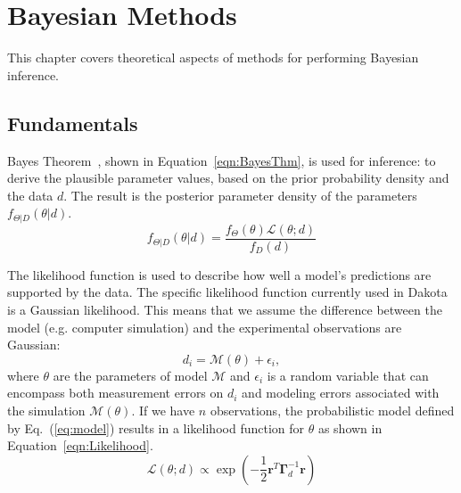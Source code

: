 \chapter{Bayesian Methods}\label{uq:bayes}


This chapter covers theoretical aspects of methods for performing
Bayesian inference.

\section{Fundamentals} \label{uq:bayes:basic}

Bayes Theorem~\cite{Jaynes}, shown in Equation~\ref{eqn:BayesThm}, is
used for inference: to derive the plausible parameter values, based on
the prior probability density and the data $d$. The result is the
posterior parameter density of the parameters $f_{\Theta |D}\left(
{\theta |d} \right)$.
\begin{equation}
  \label{eqn:BayesThm}
  {f_{\Theta |D}}\left( {\theta |d} \right) = \frac{{{f_\Theta }\left( \theta  \right)\mathcal{L}\left( {\theta ;d} \right)}}{{{f_D}\left( d \right)}}
\end{equation}

The likelihood function is used to describe how well a model's
predictions are supported by the data.  
The specific likelihood function currently used in Dakota is a Gaussian
likelihood. This means that we assume the difference between the model
(e.g. computer simulation) and the experimental observations are
Gaussian:
\begin{equation}\label{eq:model}
d_i = \mathcal{M}(\theta) + \epsilon_i,
\end{equation}
where $\theta$ are the parameters of model $\mathcal{M}$ and
$\epsilon_i$ is a random variable that can encompass both measurement
errors on $d_i$ and modeling errors associated with the simulation
$\mathcal{M}(\theta)$. %
If we have $n$ observations, the probabilistic model defined by 
Eq.~(\ref{eq:model}) results in a likelihood function for $\theta$ 
as shown in Equation~\ref{eqn:Likelihood}.
\begin{equation}\label{eqn:Likelihood}
\mathcal{L}(\theta;d) \propto %
\exp \left(
-\frac{1}{2} \boldsymbol{r}^T \boldsymbol{\Gamma}_d^{-1} \boldsymbol{r} 
\right)
\end{equation}

